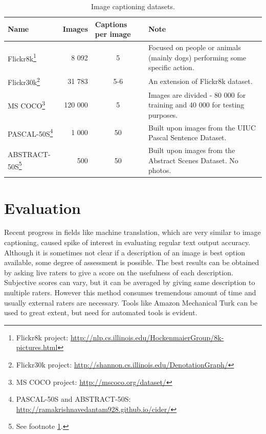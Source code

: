 \def\arraystretch{1.2}%

\begin{center}
	\begin{longtable}{|l|m{2cm}|m{2cm}|m{4.7cm}|}
		\caption{Image captioning datasets.} \label{tab:datasets} \\

	   	\hline
	   	\multicolumn{1}{|l|}{\textbf{Name}} &
	   	\textbf{Images} &
	   	\textbf{Captions per image} &
	   	\textbf{Note} \\
	   	\hline \hline
		\endhead

	   	Flickr8k\footnote{Flickr8k project: \url{http://nlp.cs.illinois.edu/HockenmaierGroup/8k-pictures.html}} &
		   	\multicolumn{1}{r|}{8 092} &
		   	\multicolumn{1}{c|}{5} &
		   	Focused on people or animals (mainly dogs) performing some specific action. \\ \hline
	   	Flickr30k\footnote{Flickr30k project: \url{http://shannon.cs.illinois.edu/DenotationGraph/}} &
		   	\multicolumn{1}{r|}{31 783} &
		   	\multicolumn{1}{c|}{5-6} &
		   	An extension of Flickr8k dataset. \\ \hline
	   	MS COCO\footnote{MS COCO project: \url{http://mscoco.org/dataset/}} &
		   	\multicolumn{1}{r|}{120 000} &
		   	\multicolumn{1}{c|}{5} &
		   	Images are divided - 80 000 for training and 40 000 for testing purposes. \\ \hline
	   	PASCAL-50S\footnote{\label{ft:cider}PASCAL-50S and ABSTRACT-50S: \url{http://ramakrishnavedantam928.github.io/cider/}} &
		   	\multicolumn{1}{r|}{1 000} &
		   	\multicolumn{1}{c|}{50} &
		   	Built upon images from the UIUC Pascal Sentence Dataset. \\ \hline
	   	ABSTRACT-50S\footnote{See footnote \ref{ft:cider}.} &
		   	\multicolumn{1}{r|}{500} &
		   	\multicolumn{1}{c|}{50} &
		   	Built upon images from the Abstract Scenes Dataset. No photos.\\ \hline
	\end{longtable}
\end{center}

	\section{Evaluation}
	\label{sec:evaluation}
Recent progress in fields like machine translation, which are very similar to image captioning, caused spike of interest in evaluating regular text output accuracy. Although it is sometimes not clear if a description of an image is best option available, some degree of assessment is possible. The best results can be obtained by asking live raters to give a score on the usefulness of each description. Subjective scores can vary, but it can be averaged by giving same description to multiple raters. However this method consumes tremendous amount of time and usually external raters are necessary. Tools like Amazon Mechanical Turk can be used to great extent, but need for automated tools is evident.

